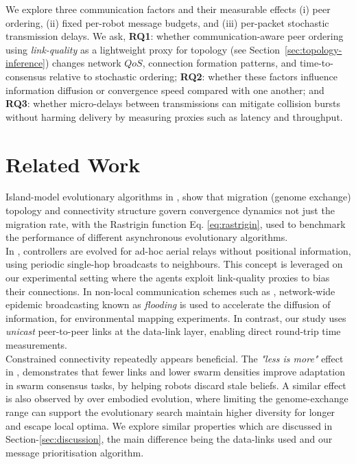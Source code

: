 \documentclass[conference]{IEEEtran}
\begin{document}

We explore three communication factors and their measurable effects (i) peer ordering, (ii) fixed per-robot message budgets, and (iii) per-packet stochastic transmission delays. We ask, \textbf{RQ1}: whether communication-aware peer ordering using \emph{link-quality} as a lightweight proxy for topology (see Section~\ref{sec:topology-inference}) changes network $QoS$, connection formation patterns, and time-to-consensus relative to stochastic ordering; \textbf{RQ2}: whether these factors influence information diffusion or convergence speed compared with one another; and \textbf{RQ3}: whether micro-delays between transmissions can mitigate collision bursts without harming delivery by measuring proxies such as latency and throughput.

\section{Related Work}
Island-model evolutionary algorithms in \cite{rucinski_impact_2010}, show that migration (genome exchange) topology and connectivity structure govern convergence dynamics not just the migration rate, with the Rastrigin function Eq. \ref{eq:rastrigin}, used to benchmark the performance of different asynchronous evolutionary algorithms. \\

In \cite{hauert_evolved_2009}, controllers are evolved for ad-hoc aerial relays without positional information, using periodic single-hop broadcasts to neighbours. This concept is leveraged on our experimental setting where the agents exploit link-quality proxies to bias their connections. In non-local communication schemes such as \cite{perrin_decentralised_2012}, network-wide epidemic broadcasting known as \emph{flooding} is used to accelerate the diffusion of information, for environmental mapping experiments. In contrast, our study uses \emph{unicast} peer-to-peer links at the data-link layer, enabling direct round-trip time measurements. \\

Constrained connectivity repeatedly appears beneficial. The \emph{"less is more"} effect in \cite{talamali_when_2021}, demonstrates that fewer links and lower swarm densities improve adaptation in swarm consensus tasks, by helping robots discard stale beliefs. A similar effect is also observed by \cite{hiraga_when_2023} over embodied evolution, where limiting the genome-exchange range can support the evolutionary search maintain higher diversity for longer and escape local optima. We explore similar properties which are discussed in Section-\ref{sec:discussion}, the main difference being the data-links used and our message prioritisation algorithm.  \\
\end{document}
